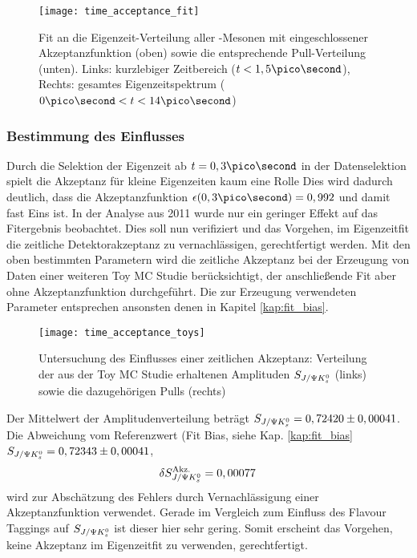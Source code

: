 \begin{figure}[hptb]
\centering
\texttt{[image: time\_acceptance\_fit]}
\caption{Fit an die Eigenzeit-Verteilung aller \Bd-Mesonen mit eingeschlossener Akzeptanzfunktion (oben) sowie die entsprechende Pull-Verteilung (unten). Links: kurzlebiger Zeitbereich ($t<1,5\pico\second$), Rechts: gesamtes Eigenzeitspektrum ($0\ps < t < 14\ps$)}
\label{fig:fit_akzeptanz}
\end{figure}

\subsubsection{Bestimmung des Einflusses}
Durch die Selektion der Eigenzeit ab $t = 0,3\ps$ in der Datenselektion spielt die Akzeptanz für kleine Eigenzeiten kaum eine Rolle Dies wird dadurch deutlich, dass die Akzeptanzfunktion $\epsilon(0,3\ps) = 0,992$ und damit fast Eins ist. In der Analyse aus 2011 \cite{lhcb-paper} wurde nur ein geringer Effekt auf das Fitergebnis beobachtet. Dies soll nun verifiziert und das Vorgehen, im Eigenzeitfit die zeitliche Detektorakzeptanz zu vernachlässigen, gerechtfertigt werden. Mit den oben bestimmten Parametern wird die zeitliche Akzeptanz bei der Erzeugung von Daten einer weiteren Toy MC Studie berücksichtigt, der anschließende Fit aber ohne Akzeptanzfunktion durchgeführt. Die zur Erzeugung verwendeten Parameter entsprechen ansonsten denen in Kapitel \ref{kap:fit_bias}.

\begin{figure}[hptb]
\centering
\texttt{[image: time\_acceptance\_toys]}
\caption{Untersuchung des Einflusses einer zeitlichen Akzeptanz: Verteilung der aus der Toy MC Studie erhaltenen Amplituden $S_{J/\Psi K_s^0}$ (links) sowie die dazugehörigen Pulls (rechts)}
\label{fig:toys_acceptance}
\end{figure}

Der Mittelwert der Amplitudenverteilung beträgt $S_{J/\Psi K_s^0} = 0,72420 \pm 0,00041$. Die Abweichung vom Referenzwert (Fit Bias, siehe Kap. \ref{kap:fit_bias} $S_{J/\Psi K_s^0} = 0,72343 \pm 0,00041$,
\begin{align}
\delta S_{J/\Psi K_s^0}^{\text{Akz.}} = 0,00077\,
\end{align}
wird zur Abschätzung des Fehlers durch Vernachlässigung einer Akzeptanzfunktion verwendet. Gerade im Vergleich zum Einfluss des Flavour Taggings auf $S_{J/\Psi K_s^0}$ ist dieser hier sehr gering. Somit erscheint das Vorgehen, keine Akzeptanz im Eigenzeitfit zu verwenden, gerechtfertigt.


